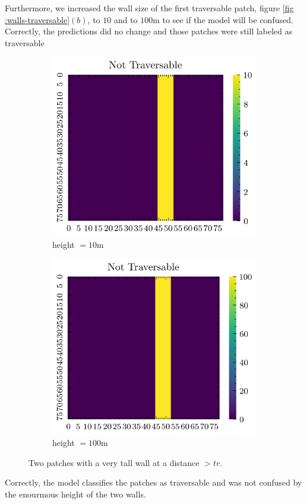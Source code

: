 Furthermore, we increased the wall size of the first traversable patch, figure \ref{fig :walls-traversable}$(b)$, to $10$ and to $100$m to see if the model will be confused. Correctly, the predictions did no change and those patches were still labeled as traversable
\begin{figure}[H]
    \centering
    \begin{subfigure}[b]{0.33\textwidth}
        \includegraphics[width=\linewidth]{../img/5/custom_patches/walls_front/big-1-2d.png}
    \caption{height $=10$m}
    \end{subfigure}   
    \begin{subfigure}[b]{0.33\textwidth}
        \includegraphics[width=\linewidth]{../img/5/custom_patches/walls_front/big-2-2d.png}
        \caption{height $=100$m}
    \end{subfigure}   
\caption{Two patches with a very tall wall at a distance $> tr$.}    
\end{figure}
Correctly, the model classifies the patches as traversable and was not confused by the enourmous height of the two walls.

